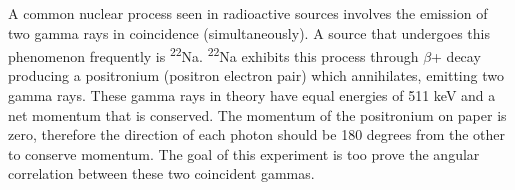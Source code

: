 \documentclass[../final_report_main.tex]{subfiles}
\begin{document}
A common nuclear process seen in radioactive sources involves the emission of
two gamma rays in coincidence (simultaneously). A source that undergoes this
phenomenon frequently is \textsuperscript{22}Na. \textsuperscript{22}Na exhibits
this process through $\beta$+ decay producing a positronium (positron electron
pair) which annihilates, emitting two gamma rays. These gamma rays in theory
have equal energies of 511 keV and a net momentum that is conserved. The
momentum of the positronium on paper is zero, therefore the direction of each
photon should be 180 degrees from the other to conserve momentum. The goal of
this experiment is too prove the angular correlation between these two
coincident gammas.
\end{document}
